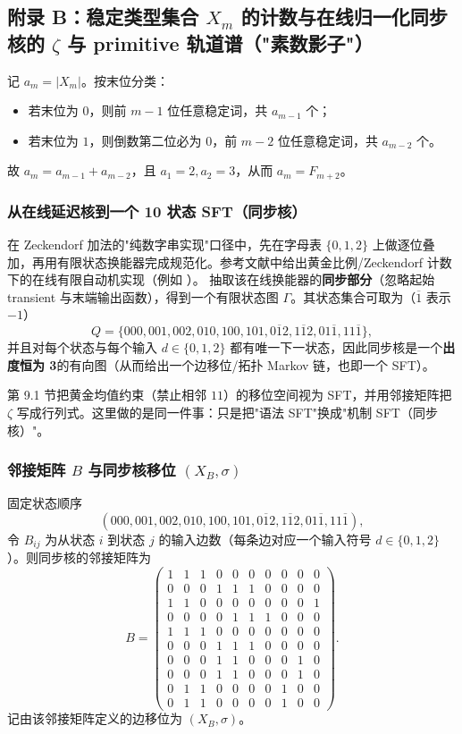 \subsection{附录 B：稳定类型集合 \texorpdfstring{$X_m$}{X\_m} 的计数与在线归一化同步核的 \texorpdfstring{$\zeta$}{zeta} 与 primitive 轨道谱（"素数影子"）}

记 $a_m=|X_m|$。按末位分类：
\begin{itemize}
  \item 若末位为 $0$，则前 $m-1$ 位任意稳定词，共 $a_{m-1}$ 个；
  \item 若末位为 $1$，则倒数第二位必为 $0$，前 $m-2$ 位任意稳定词，共 $a_{m-2}$ 个。
\end{itemize}
故 $a_m=a_{m-1}+a_{m-2}$，且 $a_1=2,a_2=3$，从而 $a_m=F_{m+2}$。

\subsubsection{从在线延迟核到一个 10 状态 SFT（同步核）}
在 Zeckendorf 加法的"纯数字串实现"口径中，先在字母表 $\{0,1,2\}$ 上做逐位叠加，再用有限状态换能器完成规范化。参考文献中给出黄金比例/Zeckendorf 计数下的在线有限自动机实现（例如 \cite{Frougny1999OnlineAddition}）。
抽取该在线换能器的\textbf{同步部分}（忽略起始 transient 与末端输出函数），得到一个有限状态图 $\Gamma$。其状态集合可取为（$\overline{1}$ 表示 $-1$）
\[
Q=\{000,001,002,010,100,101,0\overline{1}2,1\overline{1}2,01\overline{1},11\overline{1}\},
\]
并且对每个状态与每个输入 $d\in\{0,1,2\}$ 都有唯一下一状态，因此同步核是一个\textbf{出度恒为 3}的有向图（从而给出一个边移位/拓扑 Markov 链，也即一个 SFT）。

\begin{remark}[与第 9.1 节的接口对齐]
第 9.1 节把黄金均值约束（禁止相邻 $11$）的移位空间视为 SFT，并用邻接矩阵把 $\zeta$ 写成行列式。这里做的是同一件事：只是把"语法 SFT"换成"机制 SFT（同步核）"。
\end{remark}

\subsubsection{邻接矩阵 \(B\) 与同步核移位 \((X_B,\sigma)\)}
固定状态顺序
\[
(000,001,002,010,100,101,0\overline{1}2,1\overline{1}2,01\overline{1},11\overline{1}),
\]
令 $B_{ij}$ 为从状态 $i$ 到状态 $j$ 的输入边数（每条边对应一个输入符号 $d\in\{0,1,2\}$）。则同步核的邻接矩阵为
\[
B=
\begin{pmatrix}
1&1&1&0&0&0&0&0&0&0\\
0&0&0&1&1&1&0&0&0&0\\
1&1&0&0&0&0&0&0&0&1\\
0&0&0&0&1&1&1&0&0&0\\
1&1&1&0&0&0&0&0&0&0\\
0&0&0&1&1&1&0&0&0&0\\
0&0&0&1&1&0&0&0&1&0\\
0&0&0&1&1&0&0&0&1&0\\
0&1&1&0&0&0&0&1&0&0\\
0&1&1&0&0&0&0&1&0&0
\end{pmatrix}.
\]
记由该邻接矩阵定义的边移位为 $(X_B,\sigma)$。

